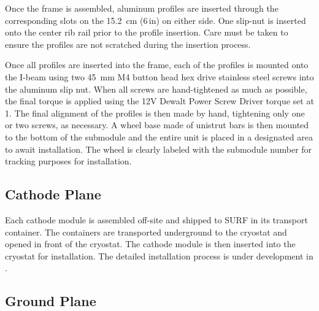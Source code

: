 Once the frame is assembled, aluminum profiles are inserted through the corresponding slots on the \SI{15.2}{\cm} (\num{6}\,in) on either side.  One slip-nut 
is inserted onto the center rib rail prior to the profile insertion.  
Care must be taken to ensure the profiles are not scratched during the insertion process. 

Once all profiles are inserted into the frame, each of the profiles is mounted onto the I-beam using two \SI{45}{\mm} M4 button head hex drive stainless steel screws into the aluminum slip nut. 
When all screws are hand-tightened as much as possible, the final torque is applied using the 12V Dewalt Power Screw Driver torque set at 1.  The final alignment of the profiles is then made by hand, tightening only one or two screws, as necessary.
A wheel base made of unistrut bars is then mounted to the bottom of the submodule and the entire unit is placed in a designated area to await installation.   The wheel is clearly labeled with the submodule number for tracking purposes for installation.


\subsection{Cathode Plane}
\label{sec:fddp-hv-prod-assy-cathode}



Each cathode module is assembled off-site and shipped to SURF in its transport container.   The containers are transported underground to the cryostat and opened in front of the cryostat.  The cathode module is then inserted into the cryostat for installation.  The detailed installation process is under development in .

\subsection{Ground Plane} %
\label{sec:fddp-prod-assy-ground-grid}


